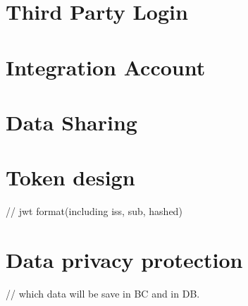 \section{Third Party Login}
\section{Integration Account}
\section{Data Sharing}
\section{Token design}
// jwt format(including iss, sub, hashed)
\section{Data privacy protection}
// which data will be save in BC and in DB.